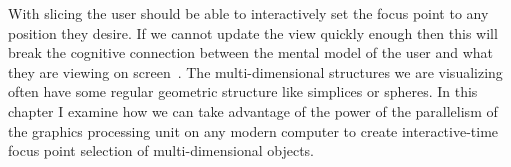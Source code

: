 
With slicing the user should be able to interactively set the focus point to
any position they desire. If we cannot update the view quickly enough then this
will break the cognitive connection between the mental model of the user and
what they are viewing on screen~\cite{Shneiderman:1987}. The multi-dimensional
structures we are visualizing often have some regular geometric structure like
simplices or spheres.  In this chapter I examine how we can take advantage of
the power of the parallelism of the graphics processing unit on any modern
computer to create interactive-time focus point selection of multi-dimensional
objects.












